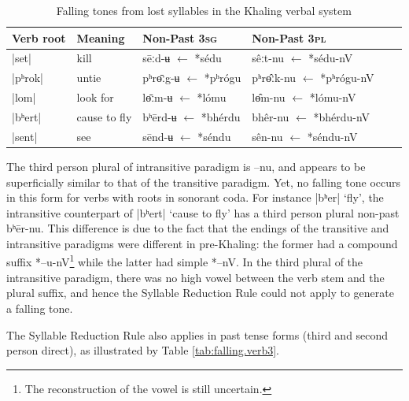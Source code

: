 \documentclass[oldfontcommands,oneside,a4paper,11pt]{article}
\newcommand{\ipa}[1]{{\phon \mbox{#1}}} %
\begin{document}
\begin{table}[H] 
\caption{Falling tones from lost syllables in the Khaling verbal system} \centering  \label{tab:falling.verb2} 
\begin{tabular}{llllll} 
\toprule 
Verb root	&Meaning	&Non-Past \textsc{3sg} & Non-Past \textsc{3pl} & \\ 
\midrule 
|set|	&	kill			&\ipa{sēːd-ʉ} $\leftarrow$ \ipa{*sédu} &\ipa{sêːt-nu} $\leftarrow$ \ipa{*sédu-nV} \\ 
|pʰrok|	&	untie		&\ipa{pʰrɵ̄ːg-ʉ} $\leftarrow$ \ipa{*pʰrógu} &\ipa{pʰrɵ̂ːk-nu} $\leftarrow$  \ipa{*pʰrógu-nV} \\
|lom|	&	look for		&\ipa{lɵ̄ːm-ʉ} $\leftarrow$ \ipa{*lómu} &\ipa{lɵ̂m-nu} $\leftarrow$ \ipa{*lómu-nV} \\ 
\midrule
|bʰert|	&	cause to fly			&\ipa{bʰērd-ʉ} $\leftarrow$ \ipa{*bhérdu}&\ipa{bhêr-nu} $\leftarrow$ \ipa{*bhérdu-nV} \\ 
|sent|	&	see			&\ipa{sēnd-ʉ} $\leftarrow$ \ipa{*séndu} &\ipa{sên-nu} $\leftarrow$ \ipa{*séndu-nV} \\ 
\bottomrule 
\end{tabular} 
\end{table} 
The  third person plural of intransitive paradigm is \ipa{--nu}, and appears to be superficially similar to that of the transitive paradigm. Yet,  no falling tone occurs in this form for verbs with roots in sonorant coda. For instance |bʰer| `fly', the intransitive counterpart of |bʰert|	`cause to fly' has a third person plural non-past \ipa{bʰēr-nu}. This difference is due to the fact that the endings of the transitive and  intransitive paradigms were different in pre-Khaling: the former had a compound suffix \ipa{*--u-nV}\footnote{The reconstruction of the vowel    is still uncertain.} while the latter had simple \ipa{*--nV}. In the third plural of the intransitive paradigm, there was no high vowel between the verb stem and the plural suffix, and hence the Syllable Reduction Rule could not apply to generate a falling tone.




The Syllable Reduction Rule also applies in past tense forms (third and second person direct), as illustrated by Table \ref{tab:falling.verb3}. 
\end{document}
